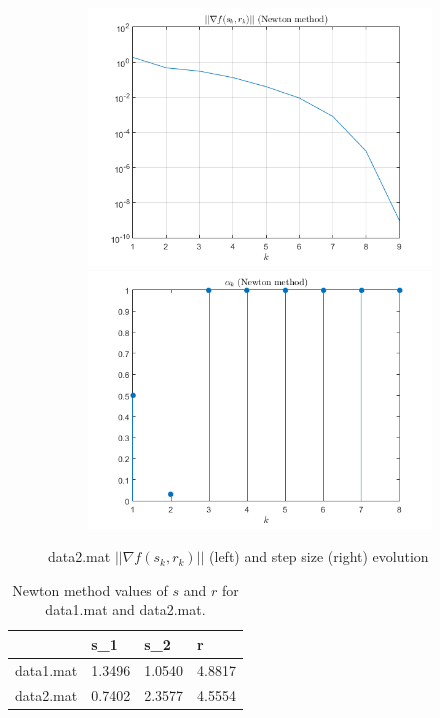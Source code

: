 \begin{figure}[H]
    \label{fig:pt2task6:data2}
    \begin{subfigure}
        \centering
        \includegraphics[width=0.45\linewidth]{part2/figures/T6_Norm_data2.png}\hspace{0em}
        \includegraphics[width=0.45\linewidth]{part2/figures/T6_stepsize_data2.png}
       
    \end{subfigure}
    \caption{data2.mat $||\nabla{f(s_k,r_k)}||$ (left) and step size (right) evolution}
\end{figure}
\begin{table}[]
\centering
\begin{tabular}{l|lll}
 & s\_1 & s\_2 & r \\ \hline
data1.mat & 1.3496 & 1.0540 & 4.8817 \\
data2.mat & 0.7402 & 2.3577 & 4.5554
\end{tabular}
\caption{Newton method values of $s$ and $r$ for data1.mat and data2.mat.}
\label{table:task6:results}
\end{table}
